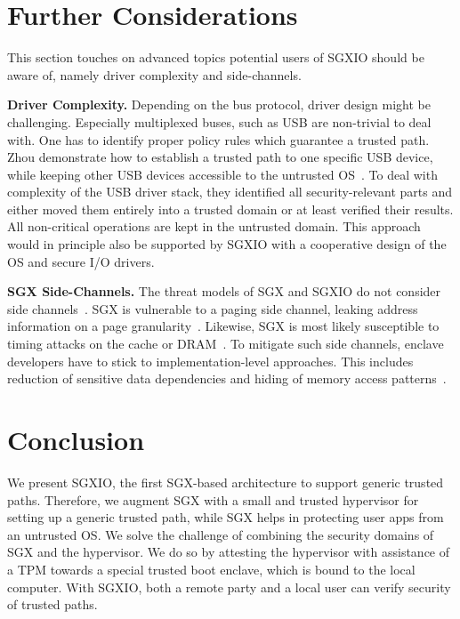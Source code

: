 \documentclass{sig-alternate-05-2015}
\begin{document}

\section{Further Considerations}\label{sec:implementation}
This section touches on advanced topics potential users of SGXIO should be aware of, namely driver complexity and side-channels. 

\textbf{Driver Complexity.} 
Depending on the bus protocol, driver design might be challenging. 
Especially multiplexed buses, such as USB are non-trivial to deal with. 
One has to identify proper policy rules which guarantee a trusted path. 
Zhou \etal demonstrate how to establish a trusted path to one specific USB device, while keeping other USB devices accessible to the untrusted OS~\cite{zhou_dancing_2014}. 
To deal with complexity of the USB driver stack, they identified all security-relevant parts and either moved them entirely into a trusted domain or at least verified their results. 
All non-critical operations are kept in the untrusted domain. 
This approach would in principle also be supported by SGXIO with a cooperative design of the OS and secure I/O drivers.

\textbf{SGX Side-Channels.}\label{sec:paging_sidechannel}
The threat models of SGX and SGXIO do not consider side channels~\cite{sgxdevguide}. 
SGX is vulnerable to a paging side channel, leaking address information on a page granularity~\cite{controlledchannel}. 
Likewise, SGX is most likely susceptible to timing attacks on the cache or DRAM~\cite{costan_intel_2016,pessl_drama:_2016}. 
To mitigate such side channels, enclave developers have to stick to implementation-level approaches. 
This includes reduction of sensitive data dependencies and hiding of memory access patterns~\cite{controlledchannel,ohrimenko_oblivious_2016,sgxtutorial}. 


\section{Conclusion}\label{sec:conclusion}

We present SGXIO, the first SGX-based architecture to support generic trusted paths. 
Therefore, we augment SGX with a small and trusted hypervisor for setting up a generic trusted path, while SGX helps in protecting user apps from an untrusted OS. 
We solve the challenge of combining the security domains of SGX and the hypervisor. 
We do so by attesting the hypervisor with assistance of a TPM towards a special trusted boot enclave, which is bound to the local computer. 
With SGXIO, both a remote party and a local user can verify security of trusted paths.
\end{document}
